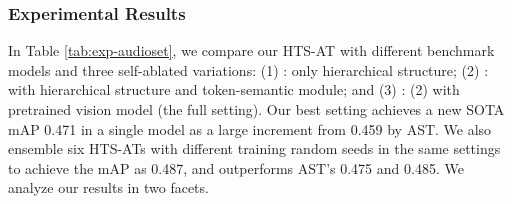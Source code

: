 \documentclass{article}
\begin{document}
\begin{table*}[t]
\centering
{}
\caption{The event-based F1-scores of each class on the DESED test set. Models with \textbf{*} are from DCASE 2021 \cite{dcase2021}, which are partial references since they use extra training data and are evaluated on DESED test set and its another private subset.}
\label{tab:exp-desed}
\vspace{-0.5cm}
\end{table*}


\vspace{-0.4cm}
\subsubsection{Experimental Results} In Table \ref{tab:exp-audioset}, we compare our HTS-AT with different benchmark models and three self-ablated variations: (1) : only hierarchical structure; (2) : with hierarchical structure and token-semantic module; and (3) : (2) with pretrained vision model (the full setting). Our best setting achieves a new SOTA mAP 0.471 in a single model as a large increment from 0.459 by AST. We also ensemble six HTS-ATs with different training random seeds in the same settings to achieve the mAP as 0.487, and outperforms AST's 0.475 and 0.485. We analyze our results in two facets.
\vspace{-0.3cm}
\end{document}
